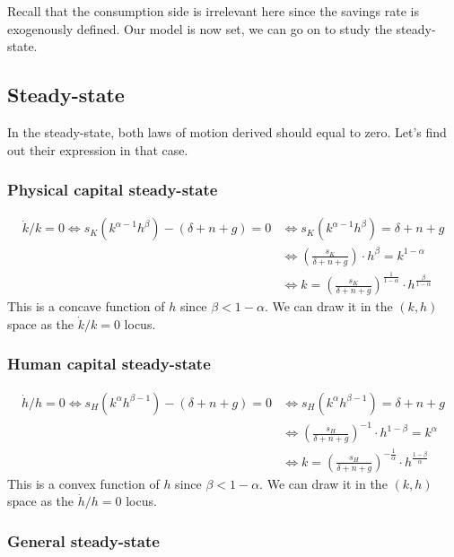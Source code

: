 \documentclass[12pt]{report}
\begin{document}
Recall that the consumption side is irrelevant here since the savings rate is exogenously defined. Our model is now set, we can go on to study the steady-state.

\subsection{Steady-state}

In the steady-state, both laws of motion derived should equal to zero. Let's find out their expression in that case.

\subsubsection{Physical capital steady-state}

\begin{align*}
\dot k/k = 0 \Leftrightarrow s_K(k^{\alpha - 1}h^\beta) - (\delta + n + g) = 0 & \Leftrightarrow s_K(k^{\alpha - 1}h^\beta) = \delta + n + g \\ & \Leftrightarrow \left(\frac{s_K}{\delta + n + g}\right)\cdot h^\beta = k^{1-\alpha} \\
& \Leftrightarrow  k = \left(\frac{s_K}{\delta + n + g}\right)^{\frac{1}{1-\alpha}}\cdot h^{\frac{\beta}{1-\alpha}}
\end{align*} This is a concave function of $h$ since $\beta < 1 -\alpha$. We can draw it in the $(k, h)$ space as the $\dot k/k = 0$ locus.

\subsubsection{Human capital steady-state}

\begin{align*}
\dot h/h = 0 \Leftrightarrow s_H(k^\alpha h^{\beta - 1}) - (\delta + n + g) = 0 & \Leftrightarrow s_H(k^{\alpha}h^{\beta - 1}) = \delta + n + g \\ & \Leftrightarrow \left(\frac{s_H}{\delta + n + g}\right)^{-1}\cdot h^{1 - \beta} = k^{\alpha} \\
& \Leftrightarrow  k = \left(\frac{s_H}{\delta + n + g}\right)^{-\frac{1}{\alpha}}\cdot h^{\frac{1 -\beta}{\alpha}}
\end{align*} This is a convex function of $h$ since $\beta < 1 -\alpha$. We can draw it in the $(k, h)$ space as the $\dot h/h = 0$ locus.

\subsubsection{General steady-state}
\end{document}
